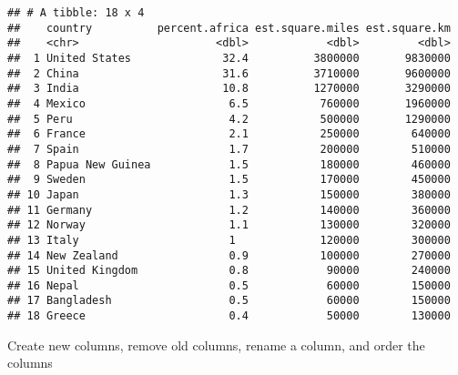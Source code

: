 \documentclass[
]{article}
\newenvironment{Shaded}{\begin{snugshade}}{\end{snugshade}}
\newcommand{\AttributeTok}[1]{\textcolor[rgb]{0.13,0.29,0.53}{#1}}
\newcommand{\CommentTok}[1]{\textcolor[rgb]{0.56,0.35,0.01}{\textit{#1}}}
\newcommand{\DecValTok}[1]{\textcolor[rgb]{0.00,0.00,0.81}{#1}}
\newcommand{\FunctionTok}[1]{\textcolor[rgb]{0.13,0.29,0.53}{\textbf{#1}}}
\newcommand{\NormalTok}[1]{#1}
\newcommand{\OtherTok}[1]{\textcolor[rgb]{0.56,0.35,0.01}{#1}}
\newcommand{\SpecialCharTok}[1]{\textcolor[rgb]{0.81,0.36,0.00}{\textbf{#1}}}
\begin{document}
\begin{verbatim}
## # A tibble: 18 x 4
##    country          percent.africa est.square.miles est.square.km
##    <chr>                     <dbl>            <dbl>         <dbl>
##  1 United States              32.4          3800000       9830000
##  2 China                      31.6          3710000       9600000
##  3 India                      10.8          1270000       3290000
##  4 Mexico                      6.5           760000       1960000
##  5 Peru                        4.2           500000       1290000
##  6 France                      2.1           250000        640000
##  7 Spain                       1.7           200000        510000
##  8 Papua New Guinea            1.5           180000        460000
##  9 Sweden                      1.5           170000        450000
## 10 Japan                       1.3           150000        380000
## 11 Germany                     1.2           140000        360000
## 12 Norway                      1.1           130000        320000
## 13 Italy                       1             120000        300000
## 14 New Zealand                 0.9           100000        270000
## 15 United Kingdom              0.8            90000        240000
## 16 Nepal                       0.5            60000        150000
## 17 Bangladesh                  0.5            60000        150000
## 18 Greece                      0.4            50000        130000
\end{verbatim}

Create new columns, remove old columns, rename a column, and order the
columns

\begin{Shaded}
\end{Shaded}
\end{document}
